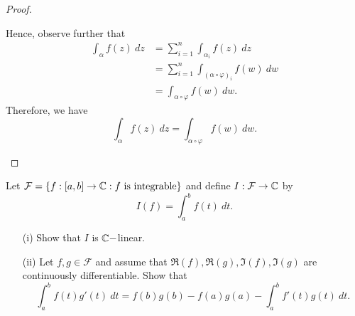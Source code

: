 \documentclass[a4paper]{article}
\begin{document}
\begin{proof}
\begin{enumerate}
            Hence, observe further that 
            \begin{align*}
                \int_{ \alpha }^{  } f(z) \ dz &= \sum_{ i=1  }^{ n } \int_{ {\alpha}_{i} }^{  } f(z) \ dz \\
                                               &= \sum_{ i=1  }^{ n } \int_{ (\alpha \circ \varphi)_i }^{  } f(w) \ dw \\
                                               &= \int_{ \alpha \circ \varphi  }^{  } f(w) \ dw.
            \end{align*}
            Therefore, we have 
            \[  \int_{ \alpha }^{  } f(z) \ dz = \int_{ \alpha \circ \varphi }^{  } f(w) \ dw. \]
\end{enumerate}
\end{proof}

\begin{problem}
    Let \( \mathcal{F} = \{ f: [a,b] \to \C : f \ \text{is integrable} \}  \) and define \( I: \mathcal{F} \to \mathbb{C}  \) by
    \[  I(f) = \int_{ a }^{ b } f(t) \ dt. \]
    \begin{enumerate}
        \item[(i)] Show that \( I  \) is \( \mathbb{C}- \)linear.
        \item[(ii)] Let \( f,g \in \mathcal{F} \) and assume that \( \Re(f), \Re(g), \Im(f), \Im(g) \) are continuously differentiable. Show that 
            \[  \int_{ a }^{ b } f(t)g'(t) \ dt = f(b)g(b) - f(a)g(a) - \int_{ a }^{ b }  f'(t) g(t) \ dt.   \]
    \end{enumerate}
\end{problem}
\end{document}

